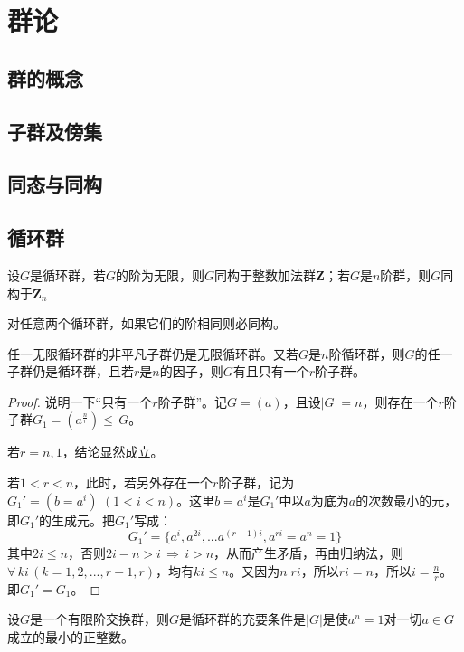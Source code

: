 \section{群论}
\subsection{群的概念}
\subsection{子群及傍集}
\subsection{同态与同构}
\subsection{循环群}

\begin{theorem}
	设$G$是循环群，若$G$的阶为无限，则$G$同构于整数加法群$\mathbf{Z}$；若$G$是$n$阶群，则$G$同构于$\mathbf{Z}_{n}$
\end{theorem}

\begin{corollary}
	对任意两个循环群，如果它们的阶相同则必同构。
\end{corollary}

\begin{theorem}
	任一无限循环群的非平凡子群仍是无限循环群。又若$G$是$n$阶循环群，则$G$的任一子群仍是循环群，且若$r$是$n$的因子，则$G$有且只有一个$r$阶子群。
\end{theorem}
\begin{proof}
	说明一下“只有一个$r$阶子群”。记$G=(a)$，且设$|G|=n$，则存在一个$r$阶子群$G_{1}=(a^{\frac{n}{r}})\leq \, G$。\par
	若$r=n,1$，结论显然成立。\par
	若$1<r<n$，此时，若另外存在一个$r$阶子群，记为$G_{1}'=(b=a^{i})\, \, (1< i< n)$。这里$b=a^{i}$是$G_{1}'$中以$a$为底为$a$的次数最小的元，即$G_{1}'$的生成元。把$G_{1}'$写成：
	\begin{equation*}
		G_{1}'=\{a^{i},a^{2i},...a^{(r-1)i},a^{ri}=a^{n}=1\}
	\end{equation*}
	其中$2i\leq n$，否则$2i-n>i\, \Rightarrow \, i>n$，从而产生矛盾，再由归纳法，则$\forall \, ki\,(k=1,2,...,r-1,r)$，均有$ki\leq n$。又因为$n\big| ri$，所以$ri=n$，所以$i=\frac{n}{r}$。即$G_{1}'=G_{1}$。
\end{proof}
\begin{theorem}\label{Yth020403}
	设$G$是一个有限阶交换群，则$G$是循环群的充要条件是$|G|$是使$a^{n}=1$对一切$a\in G$成立的最小的正整数。
\end{theorem}